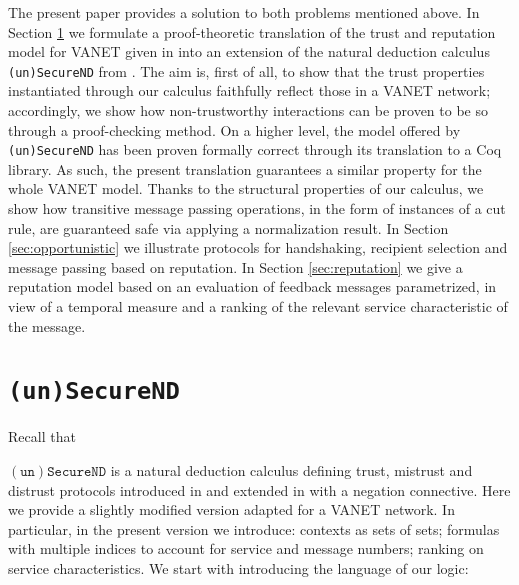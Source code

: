 \documentclass[compsoc, conference, letterpaper, 10pt, times]{IEEEtran}
\begin{document}
The present paper provides a solution to both problems mentioned above. In Section \ref{sec:logic} we formulate a proof-theoretic translation of the trust and reputation model for VANET given in \cite{glenford} into an extension of the natural deduction calculus \texttt{(un)SecureND} from \cite{DBLP:conf/ifiptm/Primiero16}. The aim is, first of all, to show that the trust properties instantiated through our calculus faithfully reflect those in a VANET network; accordingly, we show how non-trustworthy interactions can be proven to be so through a proof-checking method. On a higher level, the model offered by \texttt{(un)SecureND} has been proven formally correct through its translation to a Coq library. As such, the present translation guarantees a similar property for the whole VANET model. Thanks to the structural properties of our calculus, we show how transitive message passing operations, in the form of instances of a cut rule, are guaranteed safe via applying a normalization result. In Section \ref{sec:opportunistic} we illustrate protocols for handshaking, recipient selection and message passing based on reputation. In Section \ref{sec:reputation} we give a reputation model based on an evaluation of feedback messages parametrized, in view of a temporal measure and a ranking of the relevant service characteristic of the message.




\section{\texttt{(un)SecureND}}\label{sec:logic}

Recall that 

$\mathtt{(un)SecureND}$ is a natural deduction calculus defining trust, mistrust and distrust protocols introduced in \cite{primiero_secureND} and extended in \cite{DBLP:conf/ifiptm/Primiero16} with a negation connective. Here we provide a slightly modified version adapted for a VANET network. In particular, in the present version we introduce: contexts as sets of sets; formulas with multiple indices to account for service and message numbers; ranking on service characteristics. We start with introducing the language of our logic:
\end{document}
